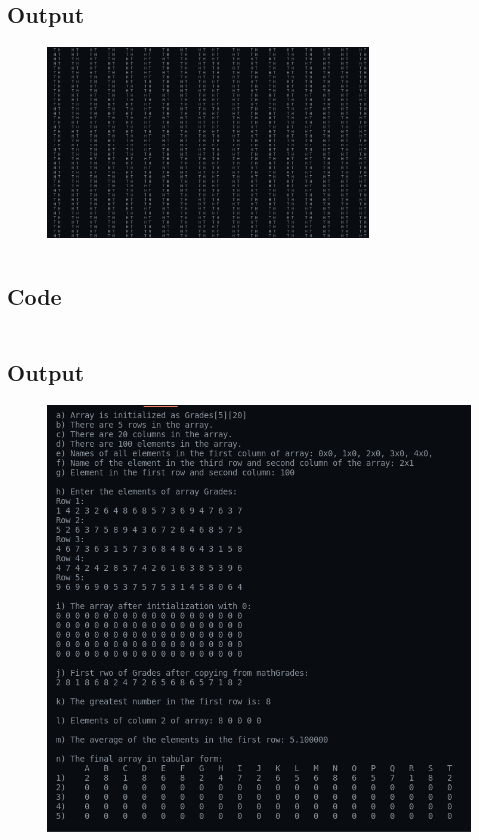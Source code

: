 \documentclass[12pt]{article}
\begin{document}
\subsection{Output}
\begin{figure}[h]
    \centering
    \includegraphics[width=0.76\textwidth]{2.png}
\end{figure}

\newpage
\section{}
\subsection{Code}
\inputminted{c}{q3.c}
\subsection{Output}
\begin{figure}[h]
    \centering
    \includegraphics[width=1\textwidth]{3.png}
\end{figure}
\end{document}
